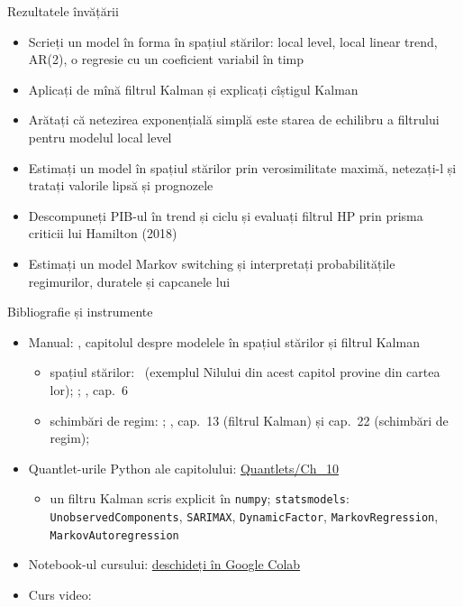 \begin{frame}{Rezultatele învățării}
\itemsize{\small}
\begin{itemize}
    \item Scrieți un model în forma în spațiul stărilor: local level, local linear trend, AR(2), o regresie cu un coeficient variabil în timp
    \item Aplicați de mînă filtrul Kalman și explicați cîștigul Kalman
    \item Arătați că netezirea exponențială simplă este starea de echilibru a filtrului pentru modelul local level
    \item Estimați un model în spațiul stărilor prin verosimilitate maximă, netezați-l și tratați valorile lipsă și prognozele
    \item Descompuneți PIB-ul în trend și ciclu și evaluați filtrul HP prin prisma criticii lui Hamilton (2018)
    \item Estimați un model Markov switching și interpretați probabilitățile regimurilor, duratele și capcanele lui
\end{itemize}
\end{frame}

\begin{frame}{Bibliografie și instrumente}
\itemsize{\small}
\begin{itemize}
    \item Manual: , capitolul despre modelele în spațiul stărilor și filtrul Kalman
    \begin{itemize}
        \item spațiul stărilor: \ (exemplul Nilului din acest capitol provine din cartea lor); ; , cap.~6
        \item schimbări de regim: ; , cap.~13 (filtrul Kalman) și cap.~22 (schimbări de regim); 
    \end{itemize}
    \item Quantlet-urile Python ale capitolului: \href{https://github.com/danpele/Time-Series-Analysis/tree/main/Quantlets/Ch_10}{Quantlets/Ch\_10}
    \begin{itemize}
        \item un filtru Kalman scris explicit în \texttt{numpy}; \texttt{statsmodels}: \texttt{UnobservedComponents}, \texttt{SARIMAX}, \texttt{DynamicFactor}, \texttt{MarkovRegression}, \texttt{MarkovAutoregression}
    \end{itemize}
    \item Notebook-ul cursului: \href{\colaburl{notebooks/EN/chapter10_lecture_notebook.ipynb}}{deschideți în Google Colab}
    \item Curs video: 
\end{itemize}
\end{frame}


